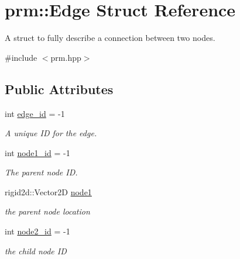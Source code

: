 \hypertarget{structprm_1_1Edge}{}\section{prm\+:\+:Edge Struct Reference}
\label{structprm_1_1Edge}


A struct to fully describe a connection between two nodes.  




{\ttfamily \#include $<$prm.\+hpp$>$}

\subsection*{Public Attributes}
\begin{DoxyCompactItemize}
\item 
\mbox{\label{structprm_1_1Edge_ac0e99ee22ee177b40873843765182041}} 
int \hyperlink{structprm_1_1Edge_ac0e99ee22ee177b40873843765182041}{edge\+\_\+id} = -\/1
\begin{DoxyCompactList}\small\item\em A unique ID for the edge. \end{DoxyCompactList}\item 
\mbox{\label{structprm_1_1Edge_a9a0ca060886a2e8be43e0c84683d0084}} 
int \hyperlink{structprm_1_1Edge_a9a0ca060886a2e8be43e0c84683d0084}{node1\+\_\+id} = -\/1
\begin{DoxyCompactList}\small\item\em The parent node ID. \end{DoxyCompactList}\item 
\mbox{\label{structprm_1_1Edge_a40d4adffbf6bb4d9ec63531b51ca845e}} 
rigid2d\+::\+Vector2D \hyperlink{structprm_1_1Edge_a40d4adffbf6bb4d9ec63531b51ca845e}{node1}
\begin{DoxyCompactList}\small\item\em the parent node location \end{DoxyCompactList}\item 
\mbox{\label{structprm_1_1Edge_a46beeb0a5adb2a6777db2a6a0986fff4}} 
int \hyperlink{structprm_1_1Edge_a46beeb0a5adb2a6777db2a6a0986fff4}{node2\+\_\+id} = -\/1
\begin{DoxyCompactList}\small\item\em the child node ID \end{DoxyCompactList}\item 

\end{DoxyCompactItemize}
